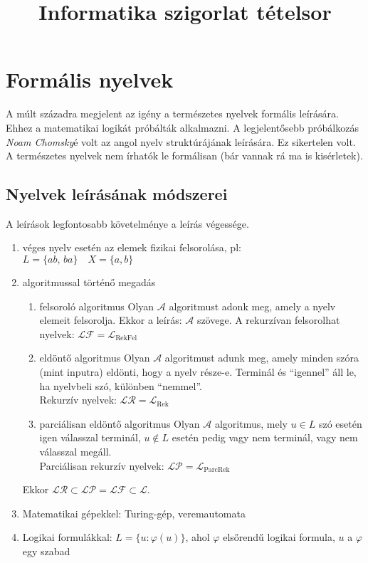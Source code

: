 \documentclass[fleqn,10pt,a4paper]{article}
\title {Informatika szigorlat tételsor}
\newcommand{\vfi}{\varphi}
\newcommand{\listazjbetu}{
  \renewcommand{\theenumi}{\alph{enumi}}
  \renewcommand{\labelenumi}{(\theenumi)}
}
\newenvironment{enumzjbetu}{\listazjbetu\begin{enumerate}}{\end{enumerate}}
\newenvironment{enumzjb}{\begin{enumzjbetu}}{\end{enumzjbetu}}
\theoremstyle{magyar}
\newcommand{\Lang}{\mathcal{L}}
\newcommand{\mktoc}{
  \pagenumbering{roman}
  \setcounter{page}{1}
  \lhead{\textbf{\thepage}}
  \tableofcontents
  \newpage
  \lhead{\textbf{\thepage}}%
  \pagenumbering{arabic}
  \setcounter{page}{1}
}
\begin{document}
  \mktoc
  \setcounter{section}{3}
  \section{Formális nyelvek}
  A múlt századra megjelent az igény a természetes nyelvek formális leírására. Ehhez a matematikai logikát próbálták
  alkalmazni. A legjelentősebb próbálkozás \emph{Noam Chomsky}é volt az angol nyelv struktúrájának leírására. Ez
  sikertelen volt. A természetes nyelvek nem írhatók le formálisan (bár vannak rá ma is kisérletek).
  
  \subsection{Nyelvek leírásának módszerei}
  A leírások legfontosabb követelménye a leírás végessége.
  \begin{enumerate}
  \item véges nyelv esetén az elemek fizikai felsorolása, pl:\\
    $L=\{ab,\,ba\}\quad X = \{a,b\}$
  \item algoritmussal történő megadás
    \begin{enumzjb}
    \item[felsoroló algoritmus] Olyan $\mathcal A$ algoritmust adonk meg, amely a nyelv elemeit felsorolja. Ekkor a
      leírás: $\mathcal A$ szövege. A rekurzívan felsorolhat nyelvek: $\mathcal{LF} = \Lang_{\text{RekFel}}$
    \item[eldöntő algoritmus] Olyan $\mathcal A$  algoritmust adunk meg, amely minden szóra (mint inputra) eldönti,
      hogy a nyelv része-e. Terminál és ``igennel'' áll le, ha nyelvbeli szó, különben ``nemmel''.\\
      Rekurzív nyelvek: $\mathcal{LR} = \Lang_{\text{Rek}}$
    \item[parciálisan eldöntő algoritmus] Olyan $\mathcal A$ algoritmus, mely $u\in L$ szó esetén igen válasszal
      terminál, $u\not\in L$ esetén pedig vagy nem terminál, vagy nem válasszal megáll.\\
      Parciálisan rekurzív nyelvek: $\mathcal{LP} = \Lang_{\text{ParcRek}}$
    \end{enumzjb}
    Ekkor $\mathcal {LR} \subset \mathcal{LP} = \mathcal{LF} \subset \Lang$.
  \item Matematikai gépekkel: Turing-gép, veremautomata
  \item Logikai formulákkal: $L=\{ u : \vfi(u)\}$, ahol $\vfi$ elsőrendű logikai formula, $u$ a $\vfi$ egy szabad

\end{enumerate}
\end{document}
